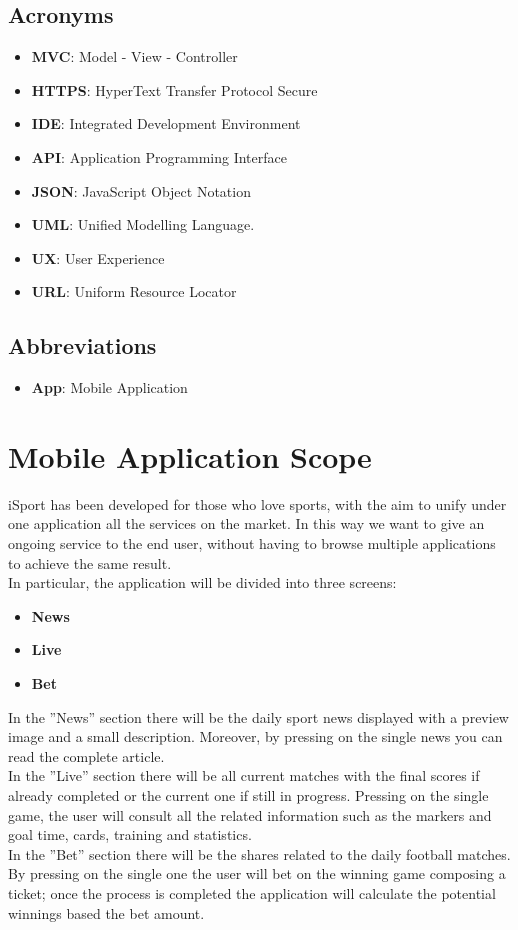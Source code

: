 \documentclass[numbers=noenddot, 12pt, a4paper, oneside]{scrbook}
\begin{document}
\subsection*{Acronyms}
\begin{itemize}
	\item \textbf{MVC}: Model - View - Controller
	\item \textbf{HTTPS}: HyperText Transfer Protocol Secure
	\item \textbf{IDE}: Integrated Development Environment
	\item \textbf{API}: Application Programming Interface
	\item \textbf{JSON}: JavaScript Object Notation
	\item \textbf{UML}: Unified Modelling Language.
	\item \textbf{UX}: User Experience
	\item \textbf{URL}: Uniform Resource Locator
\end{itemize}
\subsection*{Abbreviations}
\begin{itemize}
	\item \textbf{App}: Mobile Application 
\end{itemize}

\section{Mobile Application Scope}
iSport has been developed for those who love sports, with the aim to unify under one application all the services on the market. In this way we want to give an ongoing service to the end user, without having to browse multiple applications to achieve the same result.\\
In particular, the application will be divided into three screens:
\begin{itemize}
	\item \textbf{News}
	\item \textbf{Live}
	\item \textbf{Bet}
\end{itemize}
In the ”News” section there will be the daily sport news displayed with a preview image and a small description. Moreover, by pressing on the single news you can read the complete article.\\
In the ”Live” section there will be all current matches with the final scores if already completed or the current one if still in progress. Pressing on the single game, the user will consult all the related information such as the markers and goal time, cards, training and statistics.\\
In the ”Bet” section there will be the shares related to the daily football matches. By pressing on the single one the user will bet on the winning game composing a ticket; once the process is completed the application will calculate the potential winnings based the bet amount.
\end{document}

